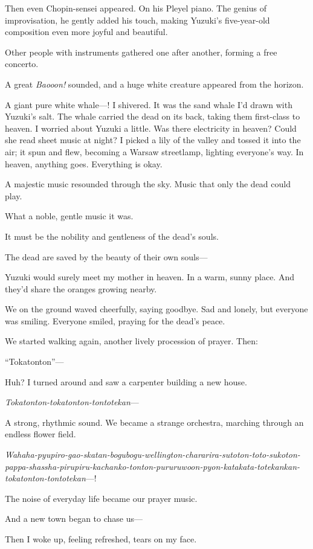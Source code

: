 \documentclass[
    a4paper,
    12pt,
    twoside,
    openany,
    UTF8,
    fontset=windows
]{ctexbook}
\begin{document}
Then even Chopin-sensei appeared. On his Pleyel piano. The genius of improvisation, he gently added his touch, making Yuzuki's five-year-old composition even more joyful and beautiful.

Other people with instruments gathered one after another, forming a free concerto.

A great \textit{Baooon!} sounded, and a huge white creature appeared from the horizon.

A giant pure white whale---! I shivered. It was the sand whale I'd drawn with Yuzuki's salt. The whale carried the dead on its back, taking them first-class to heaven. I worried about Yuzuki a little. Was there electricity in heaven? Could she read sheet music at night? I picked a lily of the valley and tossed it into the air; it spun and flew, becoming a Warsaw streetlamp, lighting everyone's way. In heaven, anything goes. Everything is okay.

A majestic music resounded through the sky. Music that only the dead could play.

What a noble, gentle music it was.

It must be the nobility and gentleness of the dead's souls.

The dead are saved by the beauty of their own souls---

Yuzuki would surely meet my mother in heaven. In a warm, sunny place. And they'd share the oranges growing nearby.

We on the ground waved cheerfully, saying goodbye. Sad and lonely, but everyone was smiling. Everyone smiled, praying for the dead's peace.

We started walking again, another lively procession of prayer. Then:

``Tokatonton''---

Huh? I turned around and saw a carpenter building a new house.

\textit{Tokatonton-tokatonton-tontotekan}---

A strong, rhythmic sound. We became a strange orchestra, marching through an endless flower field.

\textit{Wahaha-pyupiro-gao-skatan-bogubogu-wellington-chararira-sutoton-toto-sukoton-pappa-shassha-pirupiru-kachanko-tonton-pururuwoon-pyon-katakata-totekankan-tokatonton-tontotekan}---!

The noise of everyday life became our prayer music.

And a new town began to chase us---

Then I woke up, feeling refreshed, tears on my face.
\end{document}
